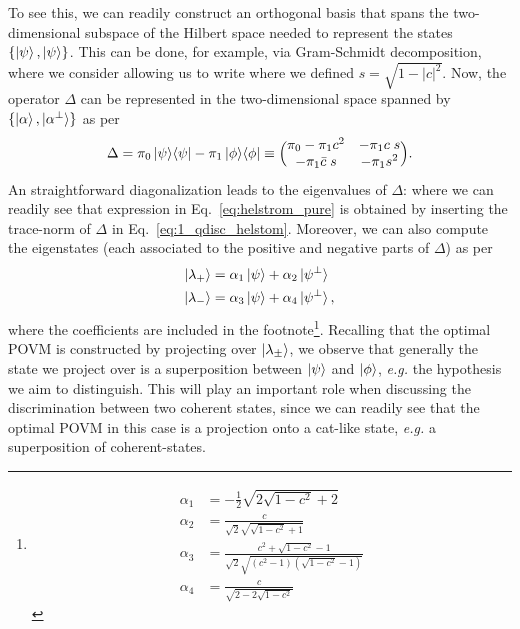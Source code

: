 To see this, we can readily construct an orthogonal basis that spans the two-dimensional subspace of the Hilbert space needed to represent the states $\llaves{\ket{\psi}, \ket{\psi}}$. This can be done, for example, via Gram-Schmidt decomposition, where we consider
allowing us to write
where we defined $s=\sqrt{1-|c|^2}$. Now, the operator $\Delta$ can be represented in the two-dimensional space spanned by $\llaves{\ket{\alpha}, \ket{\alpha^\perp}}$ as per
\begin{align}
\Delta = \pi_0 \proj{\psi} - \pi_1 \proj{\phi} \equiv \Big(\begin{matrix}\pi_0 - \pi_1 c^2 &- \pi_1 c \;s \\-\pi_1 \bar{c}\;s&- \pi_1 s^2 \\\end{matrix}\Big).
\end{align}
An straightforward diagonalization leads to the eigenvalues of $\Delta$:
where we can readily see that expression in Eq.~\ref{eq:helstrom_pure} is obtained by inserting the trace-norm of $\Delta$ in Eq.~\ref{eq:1_qdisc_helstom}. Moreover, we can also compute the eigenstates (each associated to the positive and negative parts of $\Delta$) as per
\begin{align}\label{eq:projectors_pure}
\ket{\lambda_+} &= \alpha_1 \ket{\psi} + \alpha_2 \ket{\psi^\perp} \\
\ket{\lambda_-} &= \alpha_3 \ket{\psi} + \alpha_4 \ket{\psi^\perp},
\end{align}
where the coefficients are included in the footnote\footnote{\begin{align}\alpha_1 &=  -\frac{1}{2} \sqrt{2 \sqrt{1-c^2}+2} \\
\alpha_2 &= \frac{c}{\sqrt{2} \sqrt{\sqrt{1-c^2}+1}}\\
\alpha_3 &= \frac{c^2+\sqrt{1-c^2}-1}{\sqrt{2} \sqrt{\left(c^2-1\right) \left(\sqrt{1-c^2}-1\right)}}\\
\alpha_4 &= \frac{c}{\sqrt{2-2 \sqrt{1-c^2}}}\end{align}}. Recalling that the optimal POVM is constructed by projecting over $\ket{\lambda_\pm}$, we observe that generally the state we project over is a superposition between $\ket{\psi}$ and $\ket{\phi}$, \textit{e.g.} the hypothesis we aim to distinguish. This will play an important role when discussing the discrimination between two coherent states, since we can readily see that the optimal POVM in this case is a projection onto a cat-like state, \textit{e.g.} a superposition of coherent-states.

